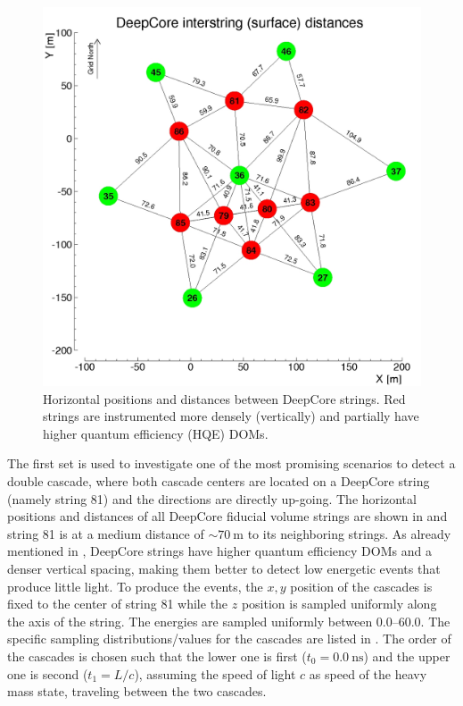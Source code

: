 \begin{figure}[h]
    \centering
    \includegraphics{figures/icecube_deepcore/deepcore_surface_distances.jpg}
    \caption[DeepCore string spacing]{Horizontal positions and distances between DeepCore strings. Red strings are instrumented more densely (vertically) and partially have higher quantum efficiency (HQE) DOMs.}
\end{figure}

The first set is used to investigate one of the most promising scenarios to detect a double cascade, where both cascade centers are located on a DeepCore string (namely string 81) and the directions are directly up-going. The horizontal positions and distances of all DeepCore fiducial volume strings are shown in  and string 81 is at a medium distance of $\sim\SI{70}{\metre}$ to its neighboring strings. As already mentioned in , DeepCore strings have higher quantum efficiency DOMs and a denser vertical spacing, making them better to detect low energetic events that produce little light. To produce the events, the $x,y$ position of the cascades is fixed to the center of string 81 while the $z$ position is sampled uniformly along the axis of the string. The energies are sampled uniformly between \SIrange[range-phrase={~and~}]{0.0}{60.0}{\gev}. The specific sampling distributions/values for the cascades are listed in . The order of the cascades is chosen such that the lower one is first ($t_0=\SI{0.0}{\nano\second}$) and the upper one is second ($t_1=L/c$), assuming the speed of light $c$ as speed of the heavy mass state, traveling between the two cascades.

